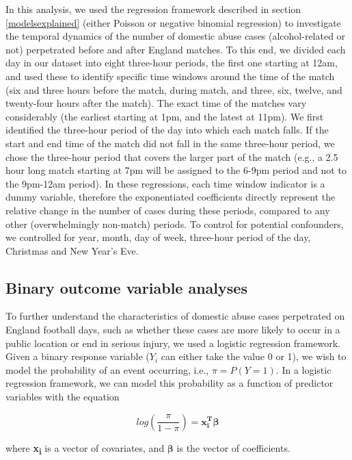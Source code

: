 \documentclass[12pt, a4paper]{article}
\newcommand{\vect}[1]{\boldsymbol{#1}}
\begin{document}
In this analysis, we used the regression framework described in section \ref{modelsexplained} (either Poisson or negative binomial regression) to investigate the temporal dynamics of the number of domestic abuse cases (alcohol-related or not) perpetrated before and after England matches. To this end, we divided each day in our dataset into eight three-hour periods, the first one starting at 12am, and used these to identify specific time windows around the time of the match (six and three hours before the match, during match, and three, six, twelve, and twenty-four hours after the match). The exact time of the matches vary considerably (the earliest starting at 1pm, and the latest at 11pm). We first identified the three-hour period of the day into which each match falls. If the start and end time of the match did not fall in the same three-hour period, we chose the three-hour period that covers the larger part of the match (e.g., a 2.5 hour long match starting at 7pm will be assigned to the 6-9pm period and not to the 9pm-12am period). In these regressions, each time window indicator is a dummy variable, therefore the exponentiated coefficients directly represent the relative change in the number of cases during these periods, compared to any other (overwhelmingly non-match) periods. To control for potential confounders, we controlled for year, month, day of week, three-hour period of the day, Christmas and New Year's Eve.


\subsection{Binary outcome variable analyses}

To further understand the characteristics of domestic abuse cases perpetrated on England football days, such as whether these cases are more likely to occur in a public location or end in serious injury, we used a logistic regression framework. Given a binary response variable ($Y_{i}$ can either take the value 0 or 1), we wish to model the probability of an event occurring, i.e., $\pi = P(Y = 1)$. In a logistic regression framework, we can model this probability as a function of predictor variables with the equation

\begin{equation}
log(\frac{\pi}{1-\pi})= \vect{x_i^{T}}\vect{\beta}
\end{equation}

where \textbf{x\textsubscript{i}} is a vector of covariates, and $\boldsymbol{\beta}$ is the vector of coefficients.
\end{document}
